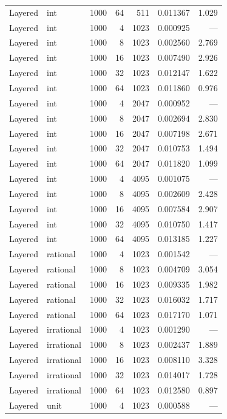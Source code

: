 \begin{longtable}{l l r r r r r}
Layered & int & 1000 & 64 & 511 & 0.011367 & 1.029 \\
\addlinespace
Layered & int & 1000 & 4 & 1023 & 0.000925 & --- \\
Layered & int & 1000 & 8 & 1023 & 0.002560 & 2.769 \\
Layered & int & 1000 & 16 & 1023 & 0.007490 & 2.926 \\
Layered & int & 1000 & 32 & 1023 & 0.012147 & 1.622 \\
Layered & int & 1000 & 64 & 1023 & 0.011860 & 0.976 \\
\addlinespace
Layered & int & 1000 & 4 & 2047 & 0.000952 & --- \\
Layered & int & 1000 & 8 & 2047 & 0.002694 & 2.830 \\
Layered & int & 1000 & 16 & 2047 & 0.007198 & 2.671 \\
Layered & int & 1000 & 32 & 2047 & 0.010753 & 1.494 \\
Layered & int & 1000 & 64 & 2047 & 0.011820 & 1.099 \\
\addlinespace
Layered & int & 1000 & 4 & 4095 & 0.001075 & --- \\
Layered & int & 1000 & 8 & 4095 & 0.002609 & 2.428 \\
Layered & int & 1000 & 16 & 4095 & 0.007584 & 2.907 \\
Layered & int & 1000 & 32 & 4095 & 0.010750 & 1.417 \\
Layered & int & 1000 & 64 & 4095 & 0.013185 & 1.227 \\
\addlinespace
Layered & rational & 1000 & 4 & 1023 & 0.001542 & --- \\
Layered & rational & 1000 & 8 & 1023 & 0.004709 & 3.054 \\
Layered & rational & 1000 & 16 & 1023 & 0.009335 & 1.982 \\
Layered & rational & 1000 & 32 & 1023 & 0.016032 & 1.717 \\
Layered & rational & 1000 & 64 & 1023 & 0.017170 & 1.071 \\
\addlinespace
Layered & irrational & 1000 & 4 & 1023 & 0.001290 & --- \\
Layered & irrational & 1000 & 8 & 1023 & 0.002437 & 1.889 \\
Layered & irrational & 1000 & 16 & 1023 & 0.008110 & 3.328 \\
Layered & irrational & 1000 & 32 & 1023 & 0.014017 & 1.728 \\
Layered & irrational & 1000 & 64 & 1023 & 0.012580 & 0.897 \\
\addlinespace
Layered & unit & 1000 & 4 & 1023 & 0.000588 & --- \\

\end{longtable}
